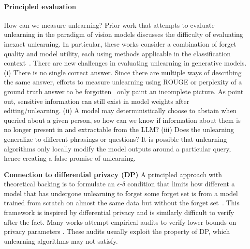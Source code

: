 \paragraph{Principled evaluation}
How can we measure unlearning?
Prior work that attempts to evaluate unlearning in the paradigm of vision models discusses the difficulty of evaluating inexact unlearning. 
In particular, these works consider a combination of forget quality and model utility, each using methods applicable in the classification context~\citep{goel2022towards,thudi2022necessity,kurmanji2023towards}.
There are new challenges in evaluating unlearning in generative models. (i) There is no single correct answer. Since there are multiple ways of describing the same answer, efforts to measure unlearning using ROUGE or perplexity of a ground truth answer to be forgotten~\citep{chen2023unlearn} only paint an incomplete picture. As \citet{patil2023can} point out, sensitive information can still exist in model weights after editing/unlearning.
(ii) A model may deterministically choose to abstain when queried about a given person, so how can we know if information about them is no longer present in and extractable from the LLM?
(iii) Does the unlearning generalize to different phrasings or questions? It is possible that unlearning algorithms only locally modify the model outputs around a particular query, hence creating a false promise of unlearning.



\textbf{Connection to differential privacy (DP)}
A principled approach with theoretical backing is to formulate an $\epsilon$-$\delta$ condition that limits how different a model that has undergone unlearning to forget some forget set is from a model trained from scratch on almost the same data but without the forget set~\citep{bourtoule2021machine,sekhari2021remember}.
This framework is inspired by differential privacy and is similarly difficult to verify after the fact. 
Many works attempt empirical audits to verify lower bounds on privacy parameters \citep{shokri2017membership,steinke2023privacy,jayaraman2019evaluating,jagielski2020auditing,nasr2021adversary}. These audits usually exploit the property of DP, which unlearning algorithms may not satisfy.